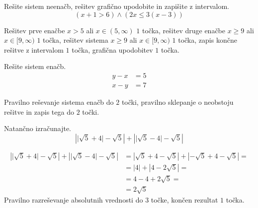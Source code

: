 \documentclass[addpoints]{exam}
\begin{document}
\begin{questions}
        

\newpage
    \question[5]
    Rešite sistem neenačb, rešitev grafično upodobite in zapišite z intervalom.
    $$ \left(x+1>6\right)\land\left(2x\leq 3(x-3)\right) $$
    
    
    \begin{solution}[11cm]
        Rešitev prve enačbe $x>5$ ali $x\in(5,\infty)$ $1$ točka, rešitev druge enačbe $x\geq 9$ ali $x\in[9,\infty)$ $1$ točka, rešitev sistema $x\geq 9$ ali $x\in[9,\infty)$ $1$ točka, zapis končne rešitve z intervalom $1$ točka, grafična upodobitev $1$ točka.
    \end{solution}




    \question[4]
    Rešite sistem enačb.
    $$ \begin{aligned}
        y-x&=5 \\ x-y&=7
    \end{aligned} $$
    
    
    \begin{solution}[8cm]
        Pravilno reševanje sistema enačb do $2$ točki, pravilno sklepanje o neobstoju rešitve in zapis tega do $2$ točki.
    \end{solution}


    
    




    \newpage 

    
    \question[4]
    Natančno izračunajte.
    $$ \left\lvert \lvert\sqrt{5}+4\rvert-\sqrt{5}\right\rvert + \left\lvert \lvert\sqrt{5}-4\rvert-\sqrt{5}\right\rvert $$
    
    
    
    \begin{solution}[10cm]
        \begin{align*}
            \left\lvert \lvert\sqrt{5}+4\rvert-\sqrt{5}\right\rvert + \left\lvert \lvert\sqrt{5}-4\rvert-\sqrt{5}\right\rvert &=
            \left\lvert \sqrt{5}+4-\sqrt{5}\right\rvert + \left\lvert -\sqrt{5}+4-\sqrt{5}\right\rvert= \\
            &= \left\lvert 4\right\rvert + \left\lvert 4-2\sqrt{5}\right\rvert= \\
            &= 4-4+2\sqrt{5}= \\
            &= 2\sqrt{5}
        \end{align*}
        Pravilno razreševanje absolutnih vrednosti do $3$ točke, končen rezultat $1$ točka.
    \end{solution}





\end{questions}
\end{document}
